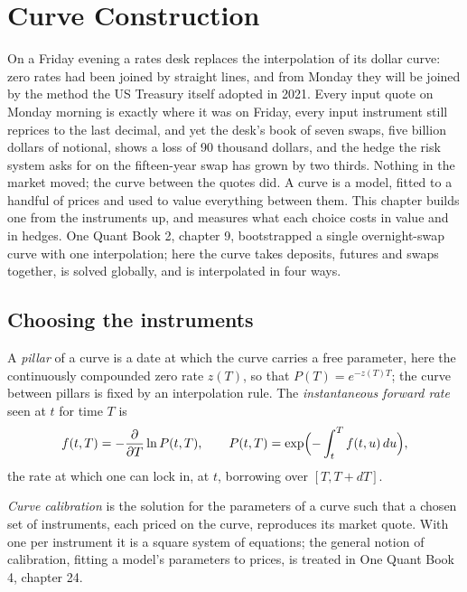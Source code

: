 \chapter{Curve Construction}\label{ch:rc:curve-construction}

On a Friday evening a rates desk replaces the interpolation of its dollar
curve: zero rates had been joined by straight lines, and from Monday they will
be joined by the method the US Treasury itself adopted in 2021. Every input
quote on Monday morning is exactly where it was on Friday, every input
instrument still reprices to the last decimal, and yet the desk's book of
seven  swaps, five billion dollars of notional, shows a loss of
90 thousand dollars, and the hedge the risk system asks for on the fifteen-year
swap has grown by two thirds. Nothing in the market moved; the curve between
the quotes did. A curve is a model, fitted to a handful of prices and used to
value everything between them. This chapter builds one from the instruments
up, and measures what each choice costs in value and in hedges. One Quant Book
2, chapter 9, bootstrapped a single overnight-swap curve with one
interpolation; here the curve takes deposits, futures and swaps together, is
solved globally, and is interpolated in four ways.

\section{Choosing the instruments}

\begin{definition}\label{def:rc:curve-construction:pillar}
A \emph{pillar} of a curve is a date at which the curve carries a
free parameter, here the continuously compounded zero rate $z(T)$, so that
$P(T)=e^{-z(T)T}$; the curve between pillars is fixed by an interpolation rule.
The \emph{instantaneous forward rate} seen at
$t$ for time $T$ is
\[
f(t,T) = -\frac{\partial}{\partial T}\ln P(t,T),
\qquad
P(t,T)=\exp\Bigl(-\int_t^T f(t,u)\,du\Bigr),
\]
the rate at which one can lock in, at $t$, borrowing over $[T, T+dT]$.
\end{definition}

\begin{definition}\label{def:rc:curve-construction:calibration}
\emph{Curve calibration} is the solution for the
 parameters of a curve such that a chosen set of instruments, each
priced on the curve, reproduces its market quote. With one  per
instrument it is a square system of equations; the general notion of
calibration, fitting a model's parameters to prices, is treated in One Quant
Book 4, chapter 24.
\end{definition}

